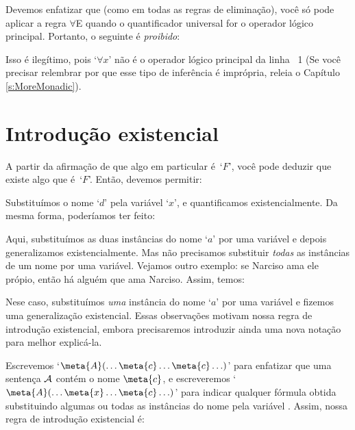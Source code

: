 Devemos enfatizar que (como em todas as regras de eliminação), você só pode aplicar a regra $\forall$E quando o quantificador universal for o operador lógico principal. Portanto, o seguinte é \emph{proibido}:
\begin{fitchproof}
\end{fitchproof}
Isso é ilegítimo, pois `$\forall x$' não é o  operador lógico principal da linha ~1 (Se você precisar relembrar por que esse tipo de inferência é imprópria, releia o  Capítulo \ref{s:MoreMonadic}).


\section{Introdução existencial}
A partir da afirmação de que algo em particular é~`$F$', você pode deduzir que existe algo que é~`$F$'. Então, devemos permitir:
\begin{fitchproof}
	 
\end{fitchproof}
 
Substituímos o nome `$d$' pela variável `$x$',  e  quantificamos existencialmente. Da mesma forma,  poderíamos ter feito:
\begin{fitchproof}
	 
\end{fitchproof}
Aqui,  substituímos as duas instâncias do nome `$a$' por uma variável e depois generalizamos existencialmente. Mas não precisamos substituir  \emph{todas}  as instâncias de um nome por  uma variável.  Vejamos outro exemplo: se Narciso ama ele própio, então há alguém que ama Narciso. Assim, temos:
\begin{fitchproof}
	 
\end{fitchproof}
Nese caso, substituímos \emph{uma} instância do nome `$a$' por uma variável e  fizemos uma  generalização existencial. Essas observações motivam nossa regra de introdução existencial, embora precisaremos introduzir ainda uma nova notação para melhor explicá-la.

Escrevemos `$\meta{A}(\ldots \meta{c} \ldots \meta{c}\ldots)$' para enfatizar que uma sentença $\mathcal{A}$ contém o nome $\meta{c}$, e escreveremos `$\meta{A}(\ldots \meta{x} \ldots \meta{c}\ldots)$' para indicar qualquer fórmula obtida substituindo algumas ou todas as instâncias do nome   pela variável . Assim, nossa regra de introdução existencial é:
 
